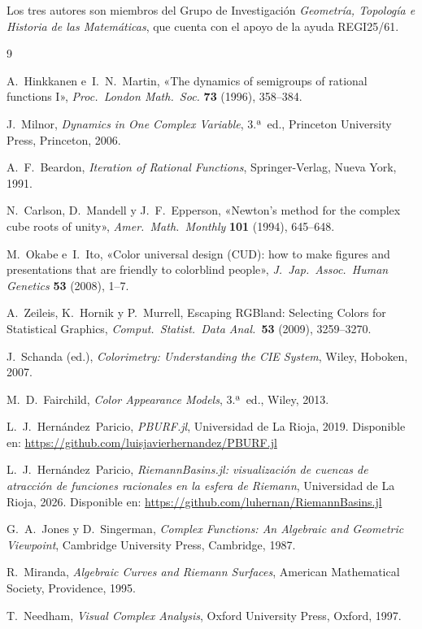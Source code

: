 \documentclass[11pt,a4paper]{article}
\theoremstyle{plain}
\theoremstyle{definition}
\theoremstyle{remark}
\begin{document}
Los tres autores son miembros del Grupo de Investigación
\emph{Geometría, Topología e Historia de las Matemáticas},
que cuenta con el apoyo de la ayuda REGI25/61.


\begin{thebibliography}{9}

A.~Hinkkanen e~I.~N.~Martin,
«The dynamics of semigroups of rational functions I»,
\textit{Proc.\ London Math.\ Soc.} \textbf{73} (1996), 358--384.

J.~Milnor,
\textit{Dynamics in One Complex Variable},
3.ª~ed., Princeton University Press, Princeton, 2006.

A.~F.~Beardon,
\textit{Iteration of Rational Functions},
Springer-Verlag, Nueva York, 1991.

N.~Carlson, D.~Mandell y J.~F.~Epperson,
«Newton's method for the complex cube roots of unity»,
\textit{Amer.\ Math.\ Monthly} \textbf{101} (1994), 645--648.

M.~Okabe e~I.~Ito,
«Color universal design (CUD): how to make figures and presentations
that are friendly to colorblind people»,
\textit{J.\ Jap.\ Assoc.\ Human Genetics} \textbf{53} (2008), 1--7.

A.~Zeileis, K.~Hornik y P.~Murrell,
\guillemotleft Escaping RGBland: Selecting Colors for Statistical
Graphics\guillemotright,
\textit{Comput.\ Statist.\ Data Anal.}\ \textbf{53} (2009),
3259--3270.

J.~Schanda (ed.),
\textit{Colorimetry: Understanding the CIE System},
Wiley, Hoboken, 2007.

M.~D.~Fairchild,
\textit{Color Appearance Models},
3.ª~ed., Wiley, 2013.

L.~J.~Hernández~Paricio,
\textit{PBURF.jl},
Universidad de La Rioja, 2019.
Disponible en: \url{https://github.com/luisjavierhernandez/PBURF.jl}



L.~J.~Hernández~Paricio,
\textit{RiemannBasins.jl: visualización de cuencas de atracción de
funciones racionales en la esfera de Riemann},
Universidad de La Rioja, 2026.
Disponible en: \url{https://github.com/luhernan/RiemannBasins.jl}


G.~A.~Jones y D.~Singerman,
\textit{Complex Functions: An Algebraic and Geometric Viewpoint},
Cambridge University Press, Cambridge, 1987.

R.~Miranda,
\textit{Algebraic Curves and Riemann Surfaces},
American Mathematical Society, Providence, 1995.

T.~Needham,
\textit{Visual Complex Analysis},
Oxford University Press, Oxford, 1997.

\end{thebibliography}
\end{document}
